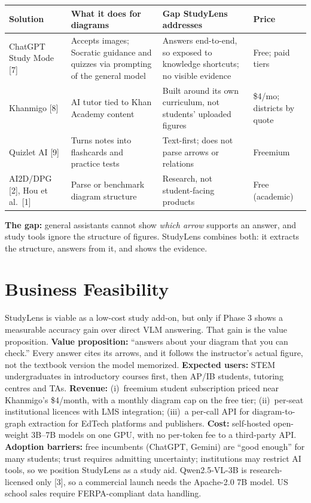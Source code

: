 \documentclass[11pt,letterpaper]{article}
\begin{document}
{\small
\begin{tabularx}{\textwidth}{@{}P{3.1cm}LLP{2.2cm}@{}}
\toprule
\textbf{Solution} & \textbf{What it does for diagrams} & \textbf{Gap StudyLens addresses} & \textbf{Price}\\
\midrule
ChatGPT Study Mode [7] & Accepts images; Socratic guidance and quizzes via prompting of the general model & Answers end-to-end, so exposed to knowledge shortcuts; no visible evidence & Free; paid tiers\\
Khanmigo [8] & AI tutor tied to Khan Academy content & Built around its own curriculum, not students' uploaded figures & \$4/mo; districts by quote\\
Quizlet AI [9] & Turns notes into flashcards and practice tests & Text-first; does not parse arrows or relations & Freemium\\
AI2D/DPG [2], Hou et al.\ [1] & Parse or benchmark diagram structure & Research, not student-facing products & Free (academic)\\
\bottomrule
\end{tabularx}}

\textbf{The gap:} general assistants cannot show \emph{which arrow} supports an answer, and study tools ignore the structure of figures. StudyLens combines both: it extracts the structure, answers from it, and shows the evidence.

\section{Business Feasibility}
StudyLens is viable as a low-cost study add-on, but only if Phase 3 shows a measurable accuracy gain over direct VLM answering. That gain is the value proposition.
\textbf{Value proposition:} ``answers about your diagram that you can check.'' Every answer cites its arrows, and it follows the instructor's actual figure, not the textbook version the model memorized.
\textbf{Expected users:} STEM undergraduates in introductory courses first, then AP/IB students, tutoring centres and TAs.
\textbf{Revenue:} (i)~freemium student subscription priced near Khanmigo's \$4/month, with a monthly diagram cap on the free tier; (ii)~per-seat institutional licences with LMS integration; (iii)~a per-call API for diagram-to-graph extraction for EdTech platforms and publishers.
\textbf{Cost:} self-hosted open-weight 3B--7B models on one GPU, with no per-token fee to a third-party API.
\textbf{Adoption barriers:} free incumbents (ChatGPT, Gemini) are ``good enough'' for many students; trust requires admitting uncertainty; institutions may restrict AI tools, so we position StudyLens as a study aid. Qwen2.5-VL-3B is research-licensed only [3], so a commercial launch needs the Apache-2.0 7B model. US school sales require FERPA-compliant data handling.
\end{document}
